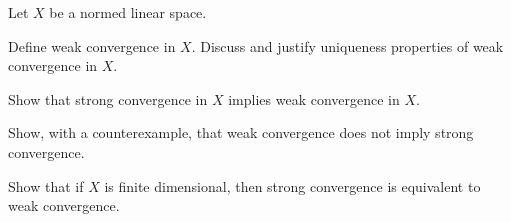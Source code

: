 Let $X$ be a normed linear space.
\begin{alist}
\item Define weak convergence in $X$. Discuss and justify uniqueness
properties of weak convergence in $X$.
\item Show that strong convergence in $X$ implies weak convergence in
$X$.
\item Show, with a counterexample, that weak convergence does not imply
strong convergence. 
\item Show that if $X$ is finite dimensional, then strong convergence
is equivalent to weak convergence.
\end{alist}

